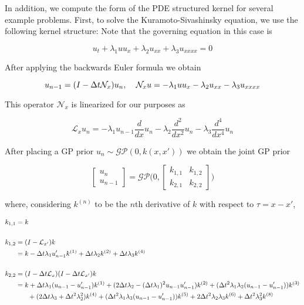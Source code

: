 \documentclass[]{article}
\begin{document}
\newpage
In addition, we compute the form of the PDE structured kernel for several example problems. First, to solve the Kuramoto-Sivashinsky equation, we use the following kernel structure: Note that the governing equation in this case is

\[ u_t+\lambda_1uu_x+\lambda_2u_{xx}+\lambda_3u_{xxxx}=0    \]

After applying the backwards Euler formula we obtain

\[ u_{n-1} = (I-\Delta t\mathcal{N}_x)u_n,\hspace{.15in} \mathcal{N}_x u  = -\lambda_1uu_x-\lambda_2u_{xx}-\lambda_3u_{xxxx}  \]

This operator $\mathcal{N}_x$ is linearized for our purposes as

\[ \mathcal{L}_x u_n = -\lambda_1 u_{n-1}\frac{d}{dx}u_n -\lambda_2\frac{d^2}{dx^2}u_n -\lambda_3\frac{d^4}{dx^4}u_n\]

After placing a GP prior $u_n\sim\mathcal{GP}(0,k(x,x'))$ we obtain the joint GP prior

\[ \begin{bmatrix}u_n\\u_{n-1}\end{bmatrix} = \mathcal{GP}\bigg(0,\begin{bmatrix}k_{1,1} & k_{1,2}\\k_{2,1} & k_{2,2}\end{bmatrix}\bigg)  \]

where, considering $k^{(n)}$ to be the $n$th derivative of $k$ with respect to $\tau=x-x'$,

\begin{align*}
k_{1,1} &= k\\
&\\
k_{1,2} &= (I-\mathcal{L}_{x'})k\\
&= k - \Delta t\lambda_1 u_{n-1}'k^{(1)}+\Delta t\lambda_2k^{(2)}+\Delta t\lambda_3k^{(4)}\\
&\\
k_{2,2} &= (I-\Delta t\mathcal{L}_x)(I-\Delta t\mathcal{L}_{x'})k\\
&= k + \Delta t\lambda_1(u_{n-1}-u_{n-1}')k^{(1)} + (2\Delta t\lambda_2-(\Delta t\lambda_1)^2u_{n-1}u_{n-1}')k^{(2)} + (\Delta t^2\lambda_1\lambda_2(u_{n-1}-u_{n-1}'))k^{(3)}\\
&\hspace{.25in}+ (2\Delta t\lambda_3+\Delta t^2\lambda_2^2)k^{(4)} + (\Delta t^2\lambda_1\lambda_3(u_{n-1}-u_{n-1}'))k^{(5)} + 2\Delta t^2\lambda_2\lambda_3k^{(6)}+\Delta t^2\lambda_3^2 k^{(8)}
\end{align*}
\end{document}

